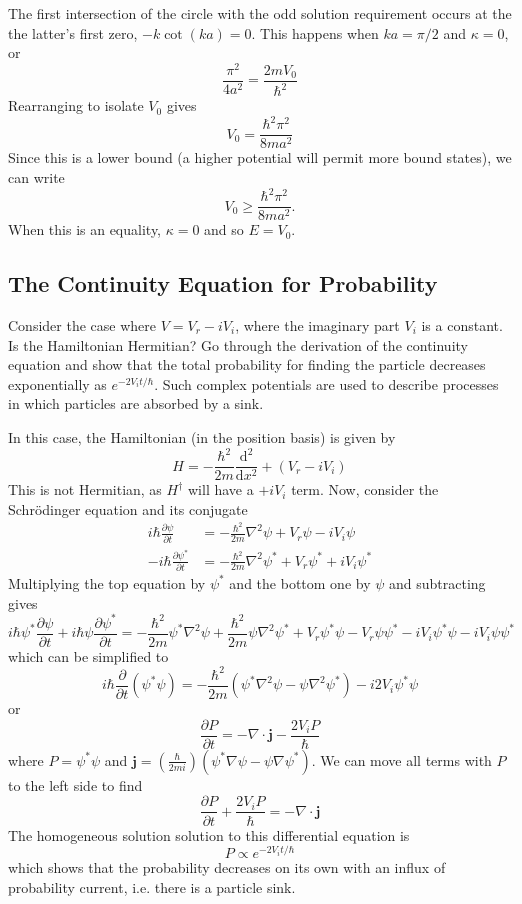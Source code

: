 \documentclass[../principles-of-quantum-mechanics.tex]{subfiles}
\begin{document}
\begin{questions}
\begin{solution}
		The first intersection of the circle with the odd solution requirement occurs at the the latter's first zero, $-k\cot(ka) = 0$. This happens when $ka = \pi/2$ and $\kappa = 0$, or
		$$\frac{\pi^2}{4a^2} = \frac{2mV_0}{\hbar^2}$$
		Rearranging to isolate $V_0$ gives
		$$V_0 = \frac{\hbar^2\pi^2}{8ma^2}$$
		Since this is a lower bound (a higher potential will permit more bound states), we can write
		$$V_0 \geq \frac{\hbar^2\pi^2}{8ma^2}.$$
		When this is an equality, $\kappa = 0$ and so $E = V_0$.
	\end{solution}

	\setcounter{subsection}{2}
	\setcounter{question}{0}
	\subsection{The Continuity Equation for Probability}
	\question Consider the case where $V = V_r - iV_i$, where the imaginary part $V_i$ is a constant. Is the Hamiltonian Hermitian? Go through the derivation of the continuity equation and show that the total probability for finding the particle decreases exponentially as $e^{-2V_it/\hbar}$. Such complex potentials are used to describe processes in which particles are absorbed by a sink.
	\begin{solution}
		In this case, the Hamiltonian (in the position basis) is given by
		$$H = -\frac{\hbar^2}{2m}\frac{\mathrm{d}^2}{\mathrm{d}x^2} + (V_r - iV_i)$$
		This is not Hermitian, as $H^\dagger$ will have a $+iV_i$ term. Now, consider the Schr\"odinger equation and its conjugate
		\begin{align*}
			i\hbar\frac{\partial\psi}{\partial t} &= -\frac{\hbar^2}{2m}\nabla^2\psi + V_r\psi - iV_i\psi \\
			-i\hbar\frac{\partial\psi^*}{\partial t} &= -\frac{\hbar^2}{2m}\nabla^2\psi^* + V_r\psi^* + iV_i\psi^*
		\end{align*}
		Multiplying the top equation by $\psi^*$ and the bottom one by $\psi$ and subtracting gives
		$$i\hbar\psi^*\frac{\partial\psi}{\partial t} + i\hbar\psi\frac{\partial\psi^*}{\partial t} = -\frac{\hbar^2}{2m}\psi^*\nabla^2\psi + \frac{\hbar^2}{2m}\psi\nabla^2\psi^* + V_r\psi^*\psi - V_r\psi\psi^* - iV_i\psi^*\psi - iV_i\psi\psi^*$$
		which can be simplified to
		$$i\hbar\frac{\partial}{\partial t}(\psi^*\psi) = -\frac{\hbar^2}{2m}(\psi^*\nabla^2\psi - \psi\nabla^2\psi^*) - i2V_i\psi^*\psi$$
		or
		$$\frac{\partial P}{\partial t} = -\nabla\cdot\mathbf{j} - \frac{2V_iP}{\hbar}$$
		where $P = \psi^*\psi$ and $\mathbf{j} = (\tfrac{\hbar}{2mi})(\psi^*\nabla\psi - \psi\nabla\psi^*)$. We can move all terms with $P$ to the left side to find
		$$\frac{\partial P}{\partial t} + \frac{2V_iP}{\hbar} = -\nabla\cdot\mathbf{j}$$
		The homogeneous solution solution to this differential equation is
		$$P \propto e^{-2V_it/\hbar}$$
		which shows that the probability decreases on its own with an influx of probability current, i.e. there is a particle sink.
	\end{solution}
	

\end{questions}
\end{document}
